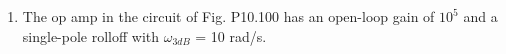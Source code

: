 \begin{enumerate}[label=\thesection.\arabic*.,ref=\thesection.\theenumi]
\item The op amp in the circuit of Fig. P10.100
has an open-loop gain of $10^{5}$ and a single-pole rolloff with
$\omega_{3dB}$ = 10 rad/s.



\end{enumerate}
